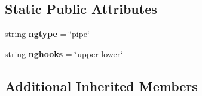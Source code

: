 \subsection*{Static Public Attributes}
\begin{DoxyCompactItemize}
\item 
\hypertarget{classcore_1_1bsd_1_1vnet_1_1_netgraph_pipe_net_adaab5b3c1ee832675683711f147f8004}{string {\bfseries ngtype} = \char`\"{}pipe\char`\"{}}\label{classcore_1_1bsd_1_1vnet_1_1_netgraph_pipe_net_adaab5b3c1ee832675683711f147f8004}

\item 
\hypertarget{classcore_1_1bsd_1_1vnet_1_1_netgraph_pipe_net_aaa4887be68c9828a998e4838347ed9b9}{string {\bfseries nghooks} = \char`\"{}upper lower\char`\"{}}\label{classcore_1_1bsd_1_1vnet_1_1_netgraph_pipe_net_aaa4887be68c9828a998e4838347ed9b9}

\end{DoxyCompactItemize}
\subsection*{Additional Inherited Members}


